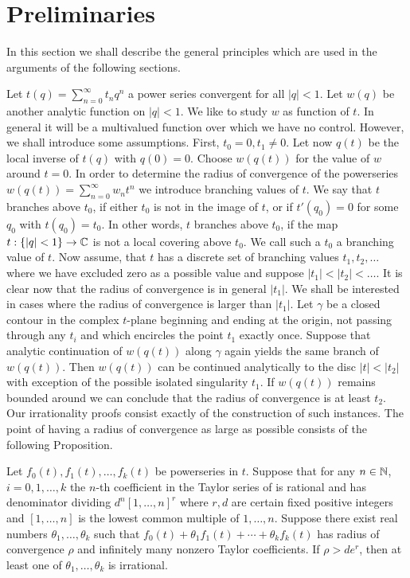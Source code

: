 \section{Preliminaries}

In this section we shall describe the general principles which are used in the arguments of the following sections.

Let $t(q) = \sum_{n=0}^{\infty} t_n q^n$ a power series convergent for all $|q| < 1$.
Let $w(q)$ be another analytic function on $|q| < 1$.
We like to study $w$ as function of $t$.
In general it will be a multivalued function over which we have no control.
However, we shall introduce some assumptions.
First, $t_0 = 0, t_1 \ne 0$.
Let now $q(t)$ be the local inverse of $t(q)$ with $q(0) = 0$.
Choose $w(q(t))$ for the value of $w$ around $t = 0$.
In order to determine the radius of convergence of the powerseries $w(q(t)) = \sum_{n=0}^{\infty} w_n t^n$ we introduce branching values of $t$.
We say that $t$ branches above $t_0$, if either $t_0$ is not in the image of $t$, or if $t'(q_0) = 0$ for some $q_0$ with $t(q_0) = t_0$.
In other words, $t$ branches above $t_0$, if the map $t : \{|q| < 1\} \to \mathbb{C}$ is not a local covering above $t_0$.
We call such a $t_0$ a branching value of $t$.
Now assume, that $t$ has a discrete set of branching values $t_1, t_2, \dots$ where we have excluded zero as a possible value and suppose $|t_1| < |t_2| < \dots$.
It is clear now that the radius of convergence is in general $|t_1|$.
We shall be interested in cases where the radius of convergence is larger than $|t_1|$.
Let $\gamma$ be a closed contour in the complex $t$-plane beginning and ending at the origin, not passing through any $t_i$ and which encircles the point $t_1$ exactly once.
Suppose that analytic continuation of $w(q(t))$ along $\gamma$ again yields the same branch of $w(q(t))$.
Then $w(q(t))$ can be continued analytically to the disc $|t| < |t_2|$ with exception of the possible isolated singularity $t_1$.
If $w(q(t))$ remains bounded around we can conclude that the radius of convergence is at least $t_2$.
Our irrationality proofs consist exactly of the construction of such instances.
The point of having a radius of convergence as large as possible consists of the following Proposition.

\begin{proposition}
    Let $f_0(t), f_1(t), \dots, f_k(t)$ be powerseries in $t$.
    Suppose that for any $n \in \mathbb{N}$, $i = 0, 1, \dots, k$ the $n$-th coefficient in the Taylor series of is rational and has denominator dividing $d^n [1, \dots, n]^r$
     where $r, d$ are certain fixed positive integers and $[1, \dots, n]$ is the lowest common multiple of $1, \dots, n$.
    Suppose there exist real numbers $\theta_1, \dots, \theta_k$ such that $f_0(t) + \theta_1 f_1(t) + \cdots + \theta_k f_k(t)$ has radius of convergence $\rho$ and infinitely many nonzero Taylor coefficients.
    If $\rho > d e^r$, then at least one of $\theta_1, \dots, \theta_k$ is irrational.
\end{proposition}

